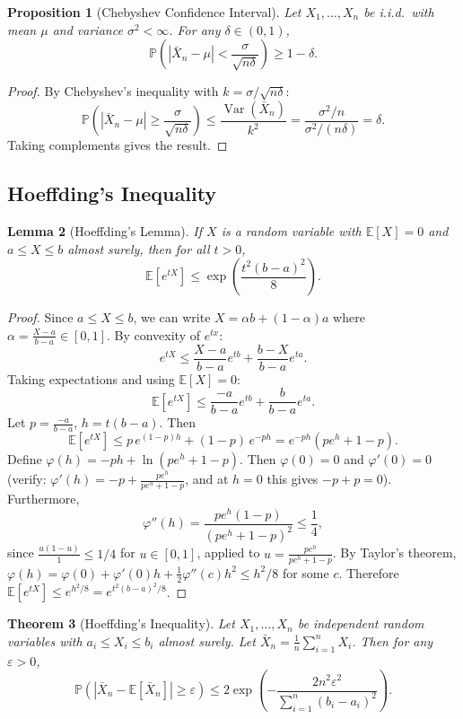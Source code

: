 \documentclass[11pt,a4paper]{article}
\theoremstyle{definition}
\theoremstyle{plain}
\newtheorem{theorem}{Theorem}[section]
\newtheorem{lemma}[theorem]{Lemma}
\newtheorem{proposition}[theorem]{Proposition}
\theoremstyle{remark}
\newcommand{\E}{\mathbb{E}}
\newcommand{\Prob}{\mathbb{P}}
\DeclareMathOperator{\Var}{Var}
\begin{document}
\begin{proposition}[Chebyshev Confidence Interval]
\label{prop:chebyshev_ci}
Let $X_1, \ldots, X_n$ be i.i.d.\ with mean $\mu$ and variance $\sigma^2 < \infty$. For
any $\delta \in (0, 1)$,
\[
    \Prob\!\left(|\bar{X}_n - \mu| < \frac{\sigma}{\sqrt{n\delta}}\right) \geq 1 - \delta.
\]
\end{proposition}

\begin{proof}
By Chebyshev's inequality with $k = \sigma/\sqrt{n\delta}$:
\[
    \Prob\!\left(|\bar{X}_n - \mu| \geq \frac{\sigma}{\sqrt{n\delta}}\right)
    \leq \frac{\Var(\bar{X}_n)}{k^2} = \frac{\sigma^2/n}{\sigma^2/(n\delta)} = \delta.
\]
Taking complements gives the result.
\end{proof}

\subsection{Hoeffding's Inequality}

\begin{lemma}[Hoeffding's Lemma]
\label{lem:hoeffding}
If $X$ is a random variable with $\E[X] = 0$ and $a \leq X \leq b$ almost surely, then
for all $t > 0$,
\[
    \E[e^{tX}] \leq \exp\!\left(\frac{t^2(b-a)^2}{8}\right).
\]
\end{lemma}

\begin{proof}
Since $a \leq X \leq b$, we can write $X = \alpha b + (1 - \alpha)a$ where
$\alpha = \frac{X - a}{b - a} \in [0, 1]$. By convexity of $e^{tx}$:
\[
    e^{tX} \leq \frac{X - a}{b - a}e^{tb} + \frac{b - X}{b - a}e^{ta}.
\]
Taking expectations and using $\E[X] = 0$:
\[
    \E[e^{tX}] \leq \frac{-a}{b-a}e^{tb} + \frac{b}{b-a}e^{ta}.
\]
Let $p = \frac{-a}{b-a}$, $h = t(b-a)$. Then
\[
    \E[e^{tX}] \leq p\,e^{(1-p)h} + (1-p)\,e^{-ph} = e^{-ph}\left(pe^h + 1 - p\right).
\]
Define $\varphi(h) = -ph + \ln(pe^h + 1 - p)$. Then $\varphi(0) = 0$ and $\varphi'(0) = 0$
(verify: $\varphi'(h) = -p + \frac{pe^h}{pe^h + 1-p}$, and at $h=0$ this gives
$-p + p = 0$). Furthermore,
\[
    \varphi''(h) = \frac{pe^h(1-p)}{(pe^h + 1-p)^2} \leq \frac{1}{4},
\]
since $\frac{u(1-u)}{1} \leq 1/4$ for $u \in [0,1]$, applied to $u = \frac{pe^h}{pe^h+1-p}$.
By Taylor's theorem, $\varphi(h) = \varphi(0) + \varphi'(0)h + \frac{1}{2}\varphi''(c)h^2
\leq h^2/8$ for some $c$. Therefore $\E[e^{tX}] \leq e^{h^2/8} = e^{t^2(b-a)^2/8}$.
\end{proof}

\begin{theorem}[Hoeffding's Inequality]
\label{thm:hoeffding}
Let $X_1, \ldots, X_n$ be independent random variables with $a_i \leq X_i \leq b_i$
almost surely. Let $\bar{X}_n = \frac{1}{n}\sum_{i=1}^n X_i$. Then for any $\varepsilon > 0$,
\[
    \Prob\!\left(|\bar{X}_n - \E[\bar{X}_n]| \geq \varepsilon\right)
    \leq 2\exp\!\left(-\frac{2n^2\varepsilon^2}{\sum_{i=1}^n (b_i - a_i)^2}\right).
\]
\end{theorem}
\end{document}
